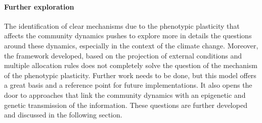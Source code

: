 \paragraph{Further exploration}

The identification of clear mechanisms due to the phenotypic plasticity that affects the community dynamics pushes to explore more in details the questions around these dynamics, especially in the context of the climate change. Moreover, the framework developed, based on the projection of external conditions and multiple allocation rules does not completely solve the question of the mechanism of the phenotypic plasticity. Further work needs to be done, but this model offers a great basis and a reference point for future implementations. It also opens the door to approaches that link the community dynamics with an epigenetic and genetic transmission of the information. These questions are further developed and discussed in the following section.



